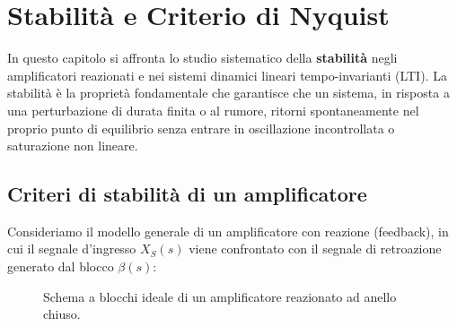 \chapter{Stabilità e Criterio di Nyquist}
\label{ch:nyquist}

In questo capitolo si affronta lo studio sistematico della \textbf{stabilità} negli amplificatori reazionati e nei sistemi dinamici lineari tempo-invarianti (LTI). La stabilità è la proprietà fondamentale che garantisce che un sistema, in risposta a una perturbazione di durata finita o al rumore, ritorni spontaneamente nel proprio punto di equilibrio senza entrare in oscillazione incontrollata o saturazione non lineare.

\section{Criteri di stabilità di un amplificatore}

Consideriamo il modello generale di un amplificatore con reazione (feedback), in cui il segnale d'ingresso $X_S(s)$ viene confrontato con il segnale di retroazione generato dal blocco $\beta(s)$:

\begin{figure}[H]
\centering
{}
\caption{Schema a blocchi ideale di un amplificatore reazionato ad anello chiuso.}
\end{figure}

